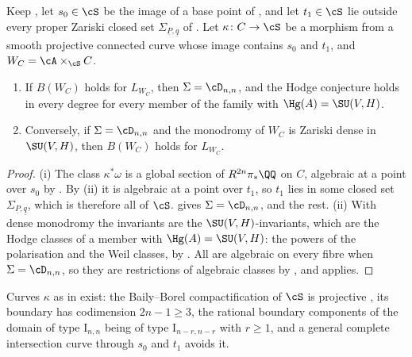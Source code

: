 \begin{corollary}
\label{cor:weilequiv}
Keep \cite[Setup~16.1]{paperI}, let $s_{0}\in\cS$ be the image of a base point of
\cite[Theorem~15.27]{paperI}, and let $t_{1}\in\cS$ lie outside every proper
Zariski closed set $\Sigma_{\underline{P},\underline{q}}$ of
\cite[Theorem~16.4]{paperI}. Let $\kappa\colon C\to\cS$ be a morphism from a smooth
projective connected curve whose image contains $s_{0}$ and $t_{1}$, and
$W_{C}=\cA\times_{\cS}C$.
\begin{enumerate}[label=\textup{(\roman*)},leftmargin=2.6em,itemsep=2pt]
\item If $B(W_{C})$ holds for $L_{W_{C}}$, then $\Sigma=\cD_{n,n}$, and the
  Hodge conjecture holds in every degree for every member of the family with
  $\Hg(A)=\SU(V,H)$.
\item Conversely, if $\Sigma=\cD_{n,n}$ and the monodromy of $W_{C}$ is Zariski
  dense in $\SU(V,H)$, then $B(W_{C})$ holds for $L_{W_{C}}$.
\end{enumerate}
\end{corollary}

\begin{proof}
(i) The class $\kappa^{*}\omega$ is a global section of
$R^{2n}\pi_{*}\QQ$ on $C$, algebraic at a point over $s_{0}$ by
\cite[Theorem~15.27]{paperI}. By (ii) it is algebraic
at a point over $t_{1}$, so $t_{1}$ lies in some closed set
$\Sigma_{\underline{P},\underline{q}}$, which is therefore all of $\cS$.
\cite[Theorem~16.4]{paperI} gives $\Sigma=\cD_{n,n}$, and \cite[Theorem~15.14(a)]{paperI}
the rest. (ii) With dense monodromy the invariants are the
$\SU(V,H)$-invariants, which are the Hodge classes of a member with
$\Hg(A)=\SU(V,H)$: the powers of the polarisation and the Weil classes, by
\cite[Theorem~4.14]{paperI}. All are algebraic on every fibre when
$\Sigma=\cD_{n,n}$, so they are restrictions of algebraic classes by
, and  applies.
\end{proof}

Curves $\kappa$ as in  exist: the Baily--Borel
compactification of $\cS$ is projective \cite{BB66}, its boundary has
codimension $2n-1\ge3$, the rational boundary components of the domain of type
$\mathrm{I}_{n,n}$ being of type $\mathrm{I}_{n-r,n-r}$ with $r\ge1$, and a
general complete intersection curve through $s_{0}$ and $t_{1}$ avoids it.

